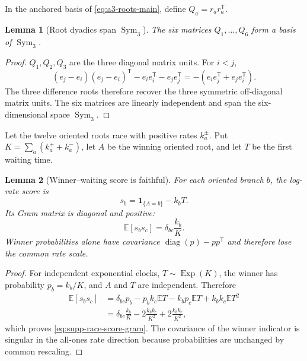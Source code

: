 \documentclass[11pt]{article}
\newtheorem{lemma}[lemma]{Lemma}
\theoremstyle{definition}
\theoremstyle{remark}
\newcommand{\one}{\mathbf 1}
\newcommand{\diag}{\operatorname{diag}}
\newcommand{\Sym}{\operatorname{Sym}}
\begin{document}
In the anchored basis of \eqref{eq:a3-roots-main}, define
$Q_a=r_ar_a^{\mathsf T}$.

\begin{lemma}[Root dyadics span $\Sym_3$]
\label{lem:supp-root-frame}
The six matrices $Q_1,\ldots,Q_6$ form a basis of $\Sym_3$.
\end{lemma}

\begin{proof}
$Q_1,Q_2,Q_3$ are the three diagonal matrix units.  For $i<j$,
\[
 (e_j-e_i)(e_j-e_i)^{\mathsf T}-e_ie_i^{\mathsf T}-e_je_j^{\mathsf T}
 =-(e_ie_j^{\mathsf T}+e_je_i^{\mathsf T}).
\]
The three difference roots therefore recover the three symmetric off-diagonal
matrix units.  The six matrices are linearly independent and span the
six-dimensional space $\Sym_3$.
\end{proof}

Let the twelve oriented roots race with positive rates $k_a^\pm$.  Put
$K=\sum_a(k_a^++k_a^-)$, let $A$ be the winning oriented root, and let $T$ be
the first waiting time.

\begin{lemma}[Winner--waiting score is faithful]
\label{lem:supp-race-score}
For each oriented branch $b$, the log-rate score is
\begin{equation}
 s_b=\one_{\{A=b\}}-k_bT.
 \label{eq:supp-race-score}
\end{equation}
Its Gram matrix is diagonal and positive:
\begin{equation}
 \mathbb E[s_bs_c]=\delta_{bc}\frac{k_b}{K}.
 \label{eq:supp-race-score-gram}
\end{equation}
Winner probabilities alone have covariance
$\diag(p)-pp^{\mathsf T}$ and therefore lose the common rate scale.
\end{lemma}

\begin{proof}
For independent exponential clocks, $T\sim\operatorname{Exp}(K)$, the winner
has probability $p_b=k_b/K$, and $A$ and $T$ are independent.  Therefore
\[
 \begin{aligned}
 \mathbb E[s_bs_c]
 &={}\delta_{bc}p_b-p_bk_c\mathbb ET-k_bp_c\mathbb ET
      +k_bk_c\mathbb ET^2\\
 &={}\delta_{bc}\frac{k_b}{K}
   -2\frac{k_bk_c}{K^2}+2\frac{k_bk_c}{K^2},
 \end{aligned}
\]
which proves \eqref{eq:supp-race-score-gram}.  The covariance of the winner
indicator is singular in the all-ones rate direction because probabilities
are unchanged by common rescaling.
\end{proof}
\end{document}
